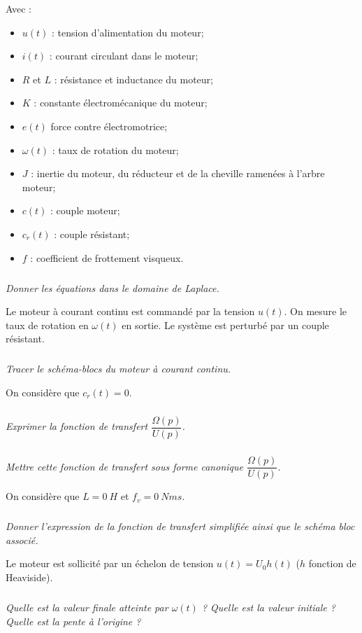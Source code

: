 \documentclass[10pt,fleqn]{article} %
\begin{document}
\begin{multicols}{2}
Avec :
\begin{itemize}
\item $u(t)$ : tension d'alimentation du moteur;
\item $i(t)$ : courant circulant dans le moteur;
\item $R$ et $L$ : résistance et inductance du moteur;
\item $K$ : constante électromécanique du moteur;
\item $e(t)$ force contre électromotrice;
\item $\omega(t)$ : taux de rotation du moteur;
\item $J$ : inertie du moteur, du réducteur et de la cheville ramenées à l'arbre moteur;
\item $c(t)$ : couple moteur; 
\item $c_r(t)$ : couple résistant; 
\item $f$ : coefficient de frottement visqueux.
\end{itemize}



\subparagraph{}\textit{Donner les équations dans le domaine de Laplace.}

\vspace{.25cm}

Le moteur à courant continu est commandé par la tension $u(t)$. On mesure le taux de rotation en $\omega(t)$ en sortie. Le système est perturbé par un couple résistant. 

\subparagraph{}\textit{Tracer le schéma-blocs du moteur à courant continu.}

\vspace{.25cm}

On considère que $c_r(t)=0$.

\subparagraph{}\textit{Exprimer la fonction de transfert $\dfrac{\Omega(p)}{U(p)}$.}


\subparagraph{}\textit{Mettre cette fonction de transfert sous forme canonique $\dfrac{\Omega(p)}{U(p)}$.}

\vspace{.25cm}

On considère que $L=\SI{0}{H}$ et $f_v=\SI{0}{Nms}$.

\subparagraph{}\textit{Donner l'expression de la fonction de transfert simplifiée ainsi que le schéma bloc associé.}


Le moteur est sollicité par un échelon de tension $u(t)=U_0 h(t)$ ($h$ fonction de Heaviside).

\subparagraph{}\textit{Quelle est la valeur finale atteinte par $\omega(t)$ ? Quelle est la valeur initiale ? Quelle est la pente à l'origine ?}


\end{multicols}
\end{document}
